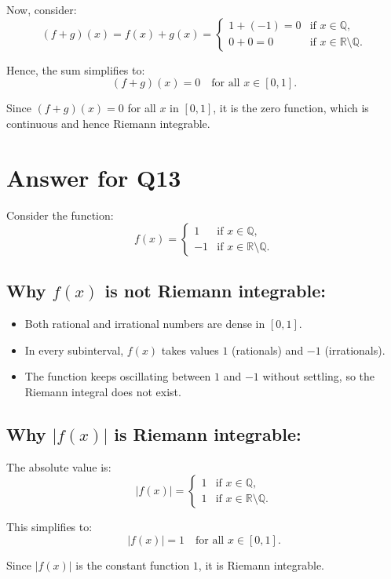 \documentclass{article}
\begin{document}
Now, consider:
\[
(f + g)(x) = f(x) + g(x) = \begin{cases}
1 + (-1) = 0 & \text{if } x \in \mathbb{Q}, \\[6pt]
0 + 0 = 0 & \text{if } x \in \mathbb{R} \setminus \mathbb{Q}.
\end{cases}
\]

Hence, the sum simplifies to:
\[
(f + g)(x) = 0 \quad \text{for all } x \in [0,1].
\]


\noindent
Since \( (f + g)(x) = 0 \) for all \( x \) in \([0,1]\), it is the zero function, which is continuous and hence Riemann integrable. 
\section*{Answer for Q13}

Consider the function:
\[
f(x) = \begin{cases}
1 & \text{if } x \in \mathbb Q, \\[6pt]
-1 & \text{if } x \in \mathbb R \setminus \mathbb Q .
\end{cases}
\]

\subsection*{Why $f(x)$ is not Riemann integrable:}
\begin{itemize}
    \item Both rational and irrational numbers are dense in $[0,1]$.
    \item In every subinterval, $f(x)$ takes values $1$ (rationals) and $-1$ (irrationals).
    \item The function keeps oscillating between $1$ and $-1$ without settling, so the Riemann integral does not exist.
\end{itemize}

\subsection*{Why $|f(x)|$ is Riemann integrable:}
The absolute value is:
\[
|f(x)| = \begin{cases}
1 & \text{if } x \in \mathbb Q, \\[6pt]
1 & \text{if } x \in \mathbb R \setminus \mathbb Q .
\end{cases}
\]

This simplifies to:
\[
|f(x)| = 1 \quad \text{for all } x \in [0,1].
\]

Since $|f(x)|$ is the constant function $1$, it is Riemann integrable.
\end{document}
